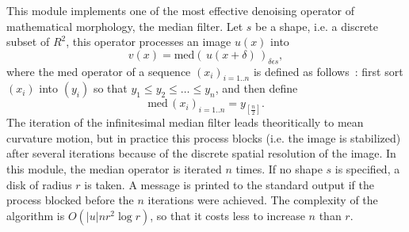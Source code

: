 This module implements one of the most effective denoising operator of 
mathematical morphology, the median filter. Let $s$ be a shape, i.e. a 
discrete subset of $R^2$, this operator processes an image $u(x)$ into
$$v(x)=\mathrm{med}\left(\,u(x+\delta)\,\right)_{\delta \epsilon s},$$
where the med operator of a sequence $(x_i)_{i=1..n}$ is defined as follows~: 
first sort $(x_i)$ into $(y_i)$ so that $y_1\leq y_2 \leq\ldots\leq y_n$, and 
then define
$$\mathrm{med}\,(x_i)_{i=1..n} = y_{[\frac{n}{2}]}.$$
The iteration of the infinitesimal median filter leads theoritically to mean 
curvature motion, but in practice this process blocks (i.e. the image is
stabilized) after several 
iterations because of the discrete spatial resolution of the image. 
In this module, the 
median operator is iterated $n$ times. If no shape $s$ is specified, a disk
of radius $r$ is taken. A message is printed to the standard output
if the process blocked before the $n$ iterations were achieved.
The complexity of the algorithm is $O(|u| n r^2 \log r)$, so that it costs
less to increase $n$ than $r$. 
